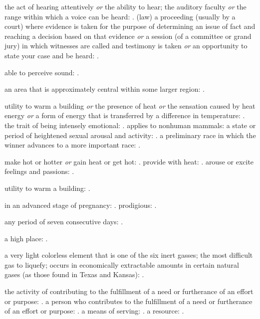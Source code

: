   the act of hearing attentively \textit{or} the ability to hear; the auditory faculty \textit{or} the range within which a voice can be heard: . (law) a proceeding (usually by a court) where evidence is taken for the purpose of determining an issue of fact and reaching a decision based on that evidence \textit{or} a session (of a committee or grand jury) in which witnesses are called and testimony is taken \textit{or} an opportunity to state your case and be heard: .

  able to perceive sound: .

  an area that is approximately central within some larger region: .

  utility to warm a building \textit{or} the presence of heat \textit{or} the sensation caused by heat energy \textit{or} a form of energy that is transferred by a difference in temperature: . the trait of being intensely emotional: . applies to nonhuman mammals: a state or period of heightened sexual arousal and activity: . a preliminary race in which the winner advances to a more important race: .

  make hot or hotter \textit{or} gain heat or get hot: . provide with heat: . arouse or excite feelings and passions: .

  utility to warm a building: .

  in an advanced stage of pregnancy: . prodigious: .

  any period of seven consecutive days: .

  a high place: .

  a very light colorless element that is one of the six inert gasses; the most difficult gas to liquefy; occurs in economically extractable amounts in certain natural gases (as those found in Texas and Kansas): .

  the activity of contributing to the fulfillment of a need or furtherance of an effort or purpose: . a person who contributes to the fulfillment of a need or furtherance of an effort or purpose: . a means of serving: . a resource: .


